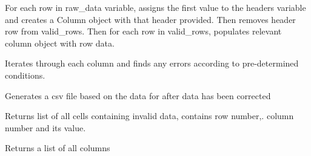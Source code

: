 \documentclass[letterpaper,10pt,english]{sphinxmanual}
\begin{document}
\begin{fulllineitems}
\begin{fulllineitems}
\end{fulllineitems}


\begin{fulllineitems}
\label{Code_rst/dat:data.Data.create_columns}
For each row in raw\_data variable, assigns the first value to the 
headers variable and creates a Column object with that header provided.
Then removes header row from valid\_rows. Then for each row in valid\_rows,
populates relevant column object with row data.

\end{fulllineitems}


\begin{fulllineitems}
\label{Code_rst/dat:data.Data.find_errors}
Iterates through each column and finds any errors according to pre-determined
conditions.

\end{fulllineitems}


\begin{fulllineitems}
\label{Code_rst/dat:data.Data.gen_file}
Generates a csv file based on the data for after
data has been corrected

\end{fulllineitems}


\begin{fulllineitems}
\label{Code_rst/dat:data.Data.getCellErrors}
Returns list of all cells containing invalid data, contains
row number,. column number and its value.

\end{fulllineitems}


\begin{fulllineitems}
\label{Code_rst/dat:data.Data.getColumns}
Returns a list of all columns

\end{fulllineitems}


\end{fulllineitems}
\end{document}
